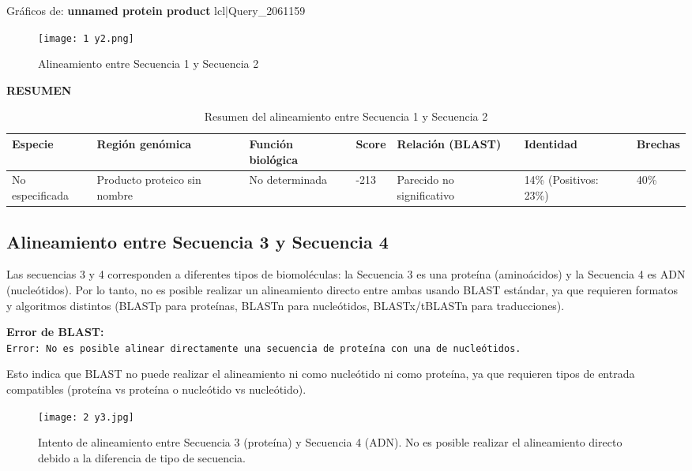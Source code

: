 \documentclass[fleqn,10pt]{article}
\begin{document}
Gráficos de: \textbf{unnamed protein product} lcl|Query\_2061159 
\begin{figure}[htbp]
    \centering
    \texttt{[image: 1 y2.png]}
    \caption{Alineamiento entre Secuencia 1 y Secuencia 2}
    \label{fig:aln-1-2}
\end{figure}

\textbf{RESUMEN}
\begin{table}[htbp]
\centering
\begin{tabular}{|l|l|l|l|l|l|l|}
\hline
\textbf{Especie} & \textbf{Región genómica} & \textbf{Función biológica} & \textbf{Score} & \textbf{Relación (BLAST)} & \textbf{Identidad} & \textbf{Brechas} \\
\hline
No especificada & Producto proteico sin nombre & No determinada & -213 & Parecido no significativo & 14\% (Positivos: 23\%) & 40\% \\
\hline
\end{tabular}
\caption{Resumen del alineamiento entre Secuencia 1 y Secuencia 2}
\end{table}
\subsection*{Alineamiento entre Secuencia 3 y Secuencia 4}

Las secuencias 3 y 4 corresponden a diferentes tipos de biomoléculas: la Secuencia 3 es una proteína (aminoácidos) y la Secuencia 4 es ADN (nucleótidos). Por lo tanto, no es posible realizar un alineamiento directo entre ambas usando BLAST estándar, ya que requieren formatos y algoritmos distintos (BLASTp para proteínas, BLASTn para nucleótidos, BLASTx/tBLASTn para traducciones).

\begin{tcolorbox}[breakable, colback=yellow!5!white, colframe=yellow!75!black, title=Nota Importante]
\textbf{Error de BLAST:} \\
\texttt{Error: No es posible alinear directamente una secuencia de proteína con una de nucleótidos.}

Esto indica que BLAST no puede realizar el alineamiento ni como nucleótido ni como proteína, ya que requieren tipos de entrada compatibles (proteína vs proteína o nucleótido vs nucleótido).
\end{tcolorbox}

\begin{figure}[htbp]
    \centering
    \texttt{[image: 2 y3.jpg]}
    \caption{Intento de alineamiento entre Secuencia 3 (proteína) y Secuencia 4 (ADN). No es posible realizar el alineamiento directo debido a la diferencia de tipo de secuencia.}
    \label{fig:aln-3-4}
\end{figure}
\end{document}
